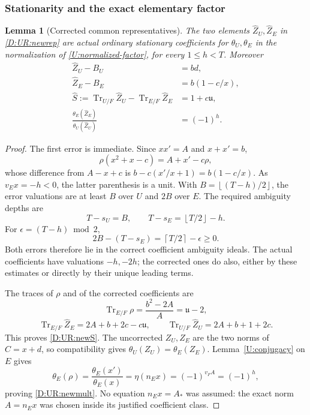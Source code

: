 \documentclass[11pt]{amsart}
\newtheorem{lemma}[theorem]{Lemma}
\theoremstyle{definition}
\theoremstyle{remark}
\newcommand{\Tr}{\operatorname{Tr}}
\newcommand{\ceil}[1]{\left\lceil #1\right\rceil}
\newcommand{\floor}[1]{\left\lfloor #1\right\rfloor}
\begin{document}
\subsubsection*{Stationarity and the exact elementary factor}
\begin{lemma}[Corrected common representatives]\label{D:UR:correctedreps}
The two elements $\widehat Z_U,\widehat Z_E$ in \eqref{D:UR:newrep} are actual
ordinary stationary coefficients for $\theta_U,\theta_E$ in the
normalization of \eqref{U:normalized-factor}, for every $1\le h<T$. Moreover
\begin{align}
 \widehat Z_U-B_U&=bd,\label{D:UR:newerrU}\\
 \widehat Z_E-B_E&=b(1-c/x),\label{D:UR:newerrE}\\
 \widehat S:=\Tr_{U/F}\widehat Z_U-
                   \Tr_{E/F}\widehat Z_E&=1+c\mathfrak u,\label{D:UR:newS}\\
 \frac{\theta_E(\widehat Z_E)}{\theta_U(\widehat Z_U)}
                 &=(-1)^h.\label{D:UR:newmult}
\end{align}
\end{lemma}
\begin{proof}
The first error is immediate. Since $xx'=A$ and $x+x'=b$,
\[
 \rho(x^2+x-c)=A+x'-c\rho,
\]
whose difference from $A-x+c$ is
$b-c(x'/x+1)=b(1-c/x)$. As $v_E x=-h<0$, the latter parenthesis is a unit.
With $B=\floor{(T-h)/2}$, the error valuations are at least $B$ over $U$
and $2B$ over $E$. The required ambiguity depths are
\[
 T-s_U=B,\qquad T-s_E=\floor{T/2}-h.
\]
For $\epsilon=(T-h)\bmod2$,
\[
 2B-(T-s_E)=\ceil{T/2}-\epsilon\ge0.
\]
Both errors therefore lie in the correct coefficient ambiguity ideals.
The actual coefficients have valuations $-h,-2h$; the corrected ones do
also, either by these estimates or directly by their unique leading terms.

The traces of $\rho$ and of the corrected coefficients are
\[
 \Tr_{E/F}\rho=\frac{b^2-2A}{A}=\mathfrak u-2,
\]
\[
 \Tr_{E/F}\widehat Z_E=2A+b+2c-c\mathfrak u,
 \qquad \Tr_{U/F}\widehat Z_U=2A+b+1+2c.
\]
This proves \eqref{D:UR:newS}. The uncorrected $Z_U,Z_E$ are the two norms of
$C=x+d$, so compatibility gives $\theta_U(Z_U)=\theta_E(Z_E)$.
Lemma~\ref{U:conjugacy} on $E$ gives
\[
 \theta_E(\rho)=\frac{\theta_E(x')}{\theta_E(x)}
      =\eta(n_E x)=(-1)^{v_FA}=(-1)^h,
\]
proving \eqref{D:UR:newmult}. No equation $n_E x=A_*$ was assumed: the exact
norm $A=n_E x$ was chosen inside its justified coefficient class.
\end{proof}
\end{document}

